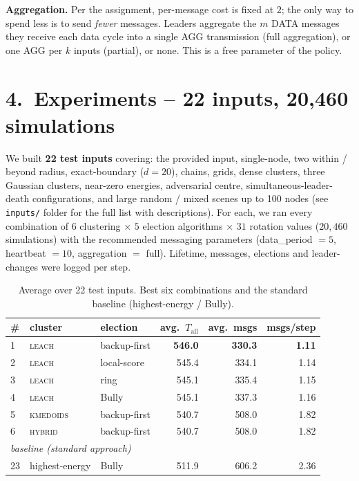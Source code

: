 \documentclass[a4paper,10pt]{article}
\begin{document}
\textbf{Aggregation.}  Per the assignment, per-message cost is fixed at
$2$; the only way to spend less is to send \emph{fewer} messages.
Leaders aggregate the $m$ DATA messages they receive each data cycle
into a single AGG transmission (full aggregation), or one AGG per $k$
inputs (partial), or none.  This is a free parameter of the policy.

\vspace{-0.6em}
\section*{4.\ Experiments -- 22 inputs, 20,460 simulations}
\vspace{-0.4em}
We built \textbf{22 test inputs} covering: the provided input,
single-node, two within / beyond radius, exact-boundary ($d{=}20$),
chains, grids, dense clusters, three Gaussian clusters, near-zero
energies, adversarial centre, simultaneous-leader-death configurations,
and large random / mixed scenes up to 100 nodes (see \texttt{inputs/}
folder for the full list with descriptions).
For each, we ran every combination of $6$ clustering $\times$ $5$
election algorithms $\times$ $31$ rotation values ($20,460$ simulations) with the recommended messaging
parameters (data\_period $=5$, heartbeat $=10$, aggregation $=$ full).
Lifetime, messages, elections and leader-changes were logged per step.

\begin{table}[h]
\small\centering
\caption{Average over 22 test inputs.  Best six combinations and the
standard baseline (highest-energy / Bully).}
\label{tab:summary}
\begin{tabular}{lllrrr}
\toprule
\# & cluster & election & avg.\ $T_{\text{all}}$ & avg.\ msgs & msgs/step \\
\midrule
1 & \textsc{leach}      & backup-first & \textbf{546.0} & \textbf{330.3} & \textbf{1.11} \\
2 & \textsc{leach}      & local-score  & 545.4 & 334.1 & 1.14 \\
3 & \textsc{leach}      & ring         & 545.1 & 335.4 & 1.15 \\
4 & \textsc{leach}      & Bully        & 545.1 & 337.3 & 1.16 \\
5 & \textsc{kmedoids}   & backup-first & 540.7 & 508.0 & 1.82 \\
6 & \textsc{hybrid}     & backup-first & 540.7 & 508.0 & 1.82 \\
\midrule
\multicolumn{3}{l}{\textit{baseline (standard approach)}} & & & \\
23 & highest-energy     & Bully        & 511.9 & 606.2 & 2.36 \\
\bottomrule
\end{tabular}
\end{table}
\end{document}
